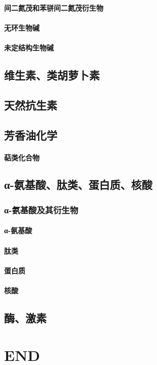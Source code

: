 \documentclass[UTF8]{../03-Chemistry}
\begin{document}
    \subsubsection{间二氮茂和苯骈间二氮茂衍生物}
    \subsubsection{无环生物碱}
    \subsubsection{未定结构生物碱}
\section{维生素、类胡萝卜素}
\section{天然抗生素}
\section{芳香油化学}
    \subsubsection{萜类化合物}
\section{α-氨基酸、肽类、蛋白质、核酸}
    \subsection{α-氨基酸及其衍生物}
        \subsubsection{α-氨基酸}
    \subsubsection{肽类}
    \subsubsection{蛋白质}
    \subsubsection{核酸}
\section{酶、激素}



\chapter{END}
\end{document}
